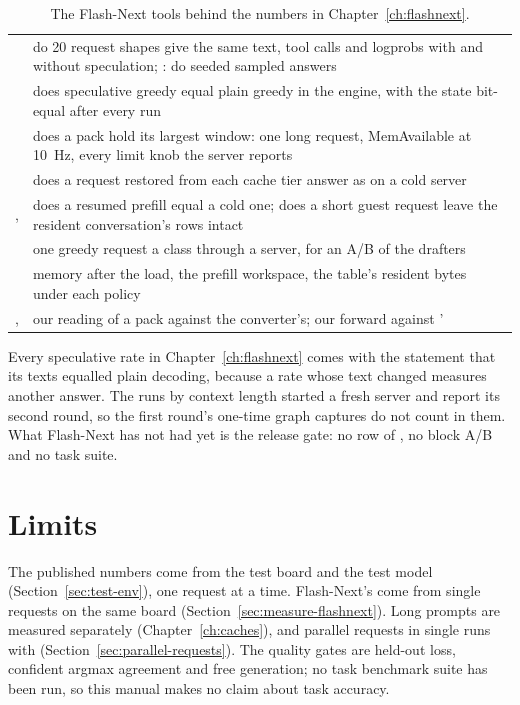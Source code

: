 \begin{table}[htbp]
\centering\small
\caption{The Flash-Next tools behind the numbers in Chapter~\ref{ch:flashnext}.}\label{tab:fn-tools}
\begin{tabularx}{\linewidth}{@{}L{.3\linewidth}Y@{}}
\toprule
{} &  \\
\midrule
{} & do 20 request shapes give the same text, tool calls and logprobs with and without speculation; : do seeded sampled answers \\
 & does speculative greedy equal plain greedy in the engine, with the state bit-equal after every run \\
 & does a pack hold its largest window: one long request, MemAvailable at 10~Hz, every limit knob the server reports \\
 & does a request restored from each cache tier answer as on a cold server \\
,  & does a resumed prefill equal a cold one; does a short guest request leave the resident conversation's rows intact \\
 & one greedy request a class through a server, for an A/B of the drafters \\
 & memory after the load, the prefill workspace, the table's resident bytes under each policy \\
,  & our reading of a pack against the converter's; our forward against ' \\
\bottomrule
\end{tabularx}
\end{table}

Every speculative rate in Chapter~\ref{ch:flashnext} comes with the statement that its texts equalled plain decoding, because a rate whose text changed measures another answer. The runs by context length started a fresh server and report its second round, so the first round's one-time graph captures do not count in them. What Flash-Next has not had yet is the release gate: no row of , no block A/B and no task suite.

\section{Limits}

The published numbers come from the test board and the test model (Section~\ref{sec:test-env}), one request at a time. Flash-Next's come from single requests on the same board (Section~\ref{sec:measure-flashnext}). Long prompts are measured separately (Chapter~\ref{ch:caches}), and parallel requests in single runs with  (Section~\ref{sec:parallel-requests}). The quality gates are held-out loss, confident argmax agreement and free generation; no task benchmark suite has been run, so this manual makes no claim about task accuracy.
